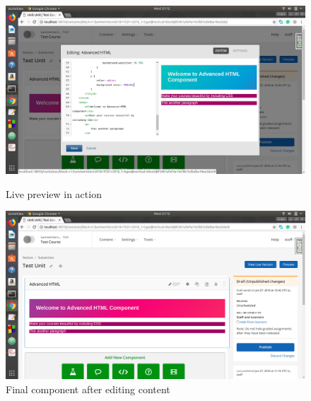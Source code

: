 \begin{figure}[ht]
  \centering
  \includegraphics[width=\textwidth]{images/demo_7}
  \caption{Live preview in action}

  \vspace*{\floatsep}

  \includegraphics[width=\textwidth]{images/demo_8}
  \caption{Final component after editing content}
\end{figure}





